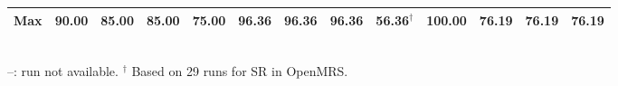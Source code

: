 \begin{table}
{\begin{tabular}{|c|cccc|cccc|cccc|}
\textbf{Max} & \textbf{90.00} & \textbf{85.00} & \textbf{85.00} & \textbf{75.00} & \textbf{96.36} & \textbf{96.36} & \textbf{96.36} & \textbf{56.36}$^{\dagger}$ & \textbf{100.00} & \textbf{76.19} & \textbf{76.19} & \textbf{76.19} \\
\hline
\end{tabular}}
\\[2pt]
\footnotesize{--: run not available. $^{\dagger}$ Based on 29 runs for SR in OpenMRS.}
\end{table}
